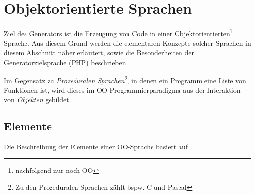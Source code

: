 \section{Objektorientierte Sprachen}
\label{sec:target_language}

Ziel des Generators ist die Erzeugung von Code in einer Objektorientierten\footnote{nachfolgend nur noch OO} Sprache. Aus diesem Grund werden die elementaren Konzepte solcher Sprachen in diesem Abschnitt näher erläutert, sowie die Besonderheiten der Generatorzielsprache (PHP) beschrieben.

Im Gegensatz zu \emph{Prozeduralen Sprachen}\footnote{Zu den Prozeduralen Sprachen zählt bspw. C und Pascal}, in denen ein Programm eine Liste von Funktionen ist, wird dieses im OO-Programmierparadigma aus der Interaktion von \emph{Objekten} gebildet. 


\subsection{Elemente}
\label{sec:elements_of_object_oriented_languages}

Die Beschreibung der Elemente einer OO-Sprache basiert auf \cite{oopSkript2012}.

